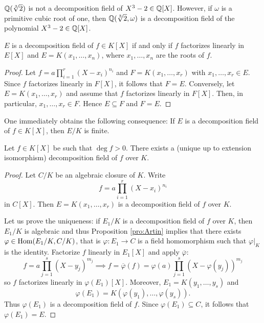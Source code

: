 \begin{example}
	$\mathbb{Q}(\sqrt[3]{2})$ is not a decomposition field of $X^3-2\in\mathbb{Q}[X]$. However, if
	$\omega$ is a primitive cubic root of one, then 
	$\mathbb{Q}(\sqrt[3]{2},\omega)$ is a decomposition field of the polynomial $X^3-2\in\mathbb{Q}[X]$. 
\end{example}

\begin{proposition}
	$E$ is a decomposition field of $f\in K[X]$ if and only if
	$f$ factorizes linearly in $E[X]$ and $E=K(x_1,\dots,x_n)$, where 
	$x_1,\dots,x_n$ are the roots of $f$. 
\end{proposition}

\begin{proof}
    Let $f=a\prod_{i=1}^r(X-x_i)^{n_i}$ and $F=K(x_1,\dots,x_r)$ with $x_1,\dots,x_r\in E$. Since $f$
    factorizes linearly in $F[X]$, it follows that $F=E$. 
    Conversely, let $E=K(x_1,\dots,x_r)$ and assume that $f$ factorizes linearly
    in $F[X]$. Then, in particular, $x_1,\dots,x_r\in F$. Hence $E\subseteq F$ and
    $F=E$. 
\end{proof}

One immediately obtains the following consequence:
If $E$ is a decomposition field of $f\in K[X]$, then $E/K$ is finite. 

\begin{theorem}
    Let $f\in K[X]$ be such that $\deg f>0$. There exists a (unique up to extension isomorphism) 
    decomposition field of $f$ over $K$. 
\end{theorem}

\begin{proof}
    Let $C/K$ be an algebraic closure of $K$. Write 
    \[
    f=a\prod_{i=1}^r(X-x_i)^{n_i}
    \]
    in $C[X]$. 
    Then $E=K(x_1,\dots,x_r)$ is a decomposition field of $f$ over $K$. 
    
    Let us prove the 
    uniqueness: if $E_1/K$ is a decomposition field of $f$ over $K$, 
    then $E_1/K$ is algebraic and thus Proposition
    \ref{pro:Artin} implies that 
    there exists $\varphi\in\operatorname{Hom}(E_1/K,C/K)$, that is $\varphi\colon E_1\to C$ is a field
    homomorphism such that $\varphi|_K$ is the identity.
    Factorize $f$ linearly in $E_1[X]$ and apply $\overline{\varphi}$:
    \[
    f=a\prod_{j=1}^s(X-y_j)^{m_j}
    \implies
    f=\overline{\varphi}(f)=\varphi(a)\prod_{j=1}^s(X-\varphi(y_j))^{m_j}
    \]
    so $f$ factorizes linearly in $\varphi(E_1)[X]$. Moreover, 
    $E_1=K(y_1,\dots,y_s)$ and  
    \[
    \varphi(E_1)=K(\varphi(y_1),\dots,\varphi(y_s)).
    \]
    Thus
    $\varphi(E_1)$ is a decomposition field of $f$. Since  
    $\varphi(E_1)\subseteq C$, it follows that $\varphi(E_1)=E$. 
\end{proof}

